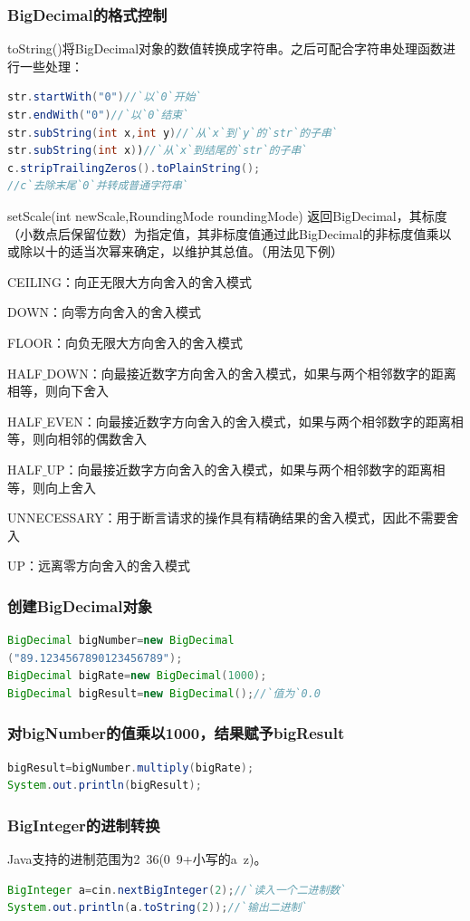 \documentclass[UTF8,a4paper,titlepage]{ctexart}
\begin{document}
\subsubsection{BigDecimal的格式控制}
toString()将BigDecimal对象的数值转换成字符串。之后可配合字符串处理函数进行一些处理：
\begin{lstlisting}[language=Java]
str.startWith("0")//`以`0`开始`
str.endWith("0")//`以`0`结束`
str.subString(int x,int y)//`从`x`到`y`的`str`的子串`
str.subString(int x))//`从`x`到结尾的`str`的子串`
c.stripTrailingZeros().toPlainString();
//c`去除末尾`0`并转成普通字符串`
\end{lstlisting}
setScale(int newScale,RoundingMode roundingMode) 返回BigDecimal，其标度（小数点后保留位数）为指定值，其非标度值通过此BigDecimal的非标度值乘以或除以十的适当次幂来确定，以维护其总值。（用法见下例）\par
CEILING：向正无限大方向舍入的舍入模式\par
DOWN：向零方向舍入的舍入模式\par
FLOOR：向负无限大方向舍入的舍入模式\par
HALF$\_$DOWN：向最接近数字方向舍入的舍入模式，如果与两个相邻数字的距离相等，则向下舍入\par
HALF$\_$EVEN：向最接近数字方向舍入的舍入模式，如果与两个相邻数字的距离相等，则向相邻的偶数舍入\par
HALF$\_$UP：向最接近数字方向舍入的舍入模式，如果与两个相邻数字的距离相等，则向上舍入\par
UNNECESSARY：用于断言请求的操作具有精确结果的舍入模式，因此不需要舍入\par
UP：远离零方向舍入的舍入模式
\subsubsection{创建BigDecimal对象}
\begin{lstlisting}[language=Java]
BigDecimal bigNumber=new BigDecimal
("89.1234567890123456789");
BigDecimal bigRate=new BigDecimal(1000);
BigDecimal bigResult=new BigDecimal();//`值为`0.0
\end{lstlisting}
\subsubsection{对bigNumber的值乘以1000，结果赋予bigResult}
\begin{lstlisting}[language=Java]
bigResult=bigNumber.multiply(bigRate);
System.out.println(bigResult);
\end{lstlisting}
\subsubsection{BigInteger的进制转换}
Java支持的进制范围为2~36(0~9+小写的a~z)。
\begin{lstlisting}[language=Java]
BigInteger a=cin.nextBigInteger(2);//`读入一个二进制数`
System.out.println(a.toString(2));//`输出二进制`
\end{lstlisting}
\end{document}
